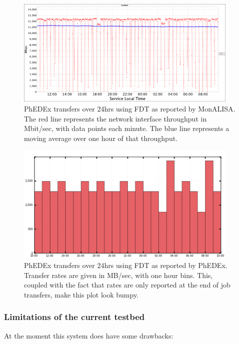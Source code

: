 \begin{figure}[h]
  \centering
  \includegraphics[width=0.95\textwidth]{Figures/FDT-transfers.png}
  \caption{PhEDEx transfers over 24hrs using FDT as reported by MonALISA. 
  The red line represents the network interface throughput in Mbit/sec, with data points
  each minute. The blue line represents a moving average over one hour of that throughput.}
  \label{fig:FDT-Transfers}
\end{figure} 

\begin{figure}[h]
  \centering
  \includegraphics[width=0.95\textwidth]{Figures/FDT-transfers-PhEDEx.png}
  \caption{PhEDEx transfers over 24hrs using FDT as reported by PhEDEx. Transfer rates are
  given in MB/sec, with one hour bins. This, coupled with the fact that rates are only 
  reported at the end of job transfers, make this plot look bumpy.}
  \label{fig:FDT-Transfers-PhEDEx}
\end{figure} 


\subsubsection{Limitations of the current testbed}

At the moment this system does have some drawbacks:

